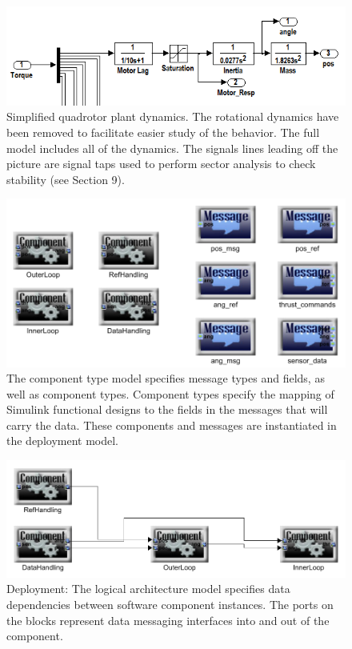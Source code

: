 
\begin{figure}
\centering
\includegraphics[width=0.9\columnwidth]{figures/quadrotor_plant.png}
    \caption{Simplified quadrotor plant dynamics.  The rotational dynamics have
been removed to facilitate easier study of the behavior.  The full model
includes all of the dynamics.  The signals lines leading off the picture are
signal taps used to perform sector analysis to check stability (see Section 9).}
    \label{fig:qr_plant}
\end{figure}

\begin{figure}
\centering
\includegraphics[width=0.9\columnwidth]{figures/quadrotor_types.png}
    \caption{The component type model specifies message types and fields, as well as component types.  Component types specify the mapping of Simulink functional designs to the fields in the messages that will carry the data.  These components and messages are instantiated in the deployment model.}
    \label{fig:qr_types}
\end{figure}

\begin{figure}
\centering
\includegraphics[width=0.9\columnwidth]{figures/quadrotor_log_arch.png}
    \caption{Deployment: The logical architecture model specifies data
dependencies between software component instances. The ports on the blocks
represent data messaging interfaces into and out of the component.}
    \label{fig:qr_log_arch}
\end{figure}

